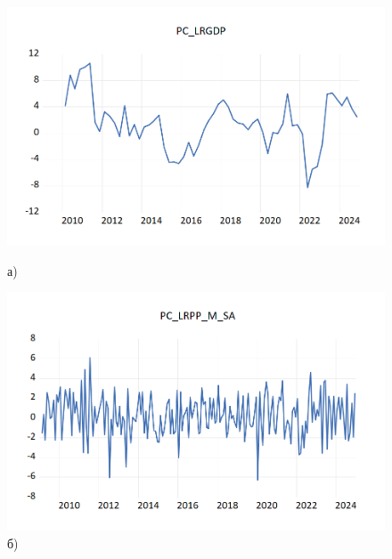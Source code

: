 \documentclass[a4paper, 14pt]{extreport}
\numberwithin{equation}{section}
\numberwithin{equation}{section}
\begin{document}
		\begin{figure}[h!]
		\centering
		\begin{minipage}{0.5\textwidth}
			\centering
			\includegraphics[scale=0.4]{images/image22}
			\caption*{а)}
		\end{minipage}%
		\begin{minipage}{0.5\textwidth}
			\centering
			\includegraphics[scale=0.4]{images/image23}
			\caption*{б)}
		\end{minipage}%
		

\end{figure}
\end{document}
